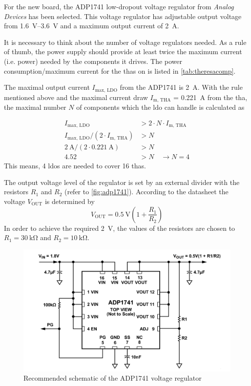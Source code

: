 For the new board, the ADP1741 low-dropout voltage regulator from \textit{Analog Devices} has been selected. This voltage regulator has adjustable output voltage from \SIrange{1.6}{3.6}{\volt} and a maximum output current of \SI{2}{\ampere}. 

It is necessary to think about the number of voltage regulators needed. As a rule of thumb, the power supply should provide at least twice the maximum current (i.e. power) needed by the components it drives. \cite{michele} The power consumption/maximum current for the \glspl{tha} on is listed in \autoref{tab:theresacomp}. 

The maximal output current $I_\text{max, LDO}$ from the ADP1741 is \SI{2}{\ampere}.
With the rule mentioned above and the maximal current draw $I_\text{m, THA}$ = \SI{0.221}{\ampere} from the \gls{tha}, the maximal number $N$ of components which the \gls{ldo} can handle is calculated as 

\begin{align*}
	I_\text{max, LDO} &> 2 \cdot N \cdot I_\text{m, THA} \\
	I_\text{max, LDO}/(2 \cdot I_\text{m, THA}) &> N \\
	\SI{2}{\ampere} / (2\cdot \SI{0.221}{\ampere}) &> N \\
	4.52 &> N \quad \rightarrow N = 4
\end{align*}
This means, 4 \glspl{ldo} are needed to cover 16 \glspl{tha}.

The output voltage level of the regulator is set by an external divider with the resistors $R_1$ and $R_2$ (refer to \autoref{fig:adp1741}). According to the datasheet \cite{adp1741} the voltage $V_\text{OUT}$ is determined by
\begin{equation}\label{eq:ldo}
	V_\text{OUT} = \SI{0.5}{\volt}\left(1 + \frac{R_1}{R_2} \right)
\end{equation}
In order to achieve the required \SI{2}{\volt}, the values of the resistors are chosen to $R_1 = \SI{30}{\kilo\ohm}$ and $R_2 = \SI{10}{\kilo \ohm}$. 

\begin{figure}[tb]
	\centering
	\includegraphics[width = \textwidth]{chap/04-theresa/img/schematic/adp1741_d}
	\caption{Recommended schematic of the ADP1741 voltage regulator \cite{adp1741}}
	\label{fig:adp1741}
\end{figure}

